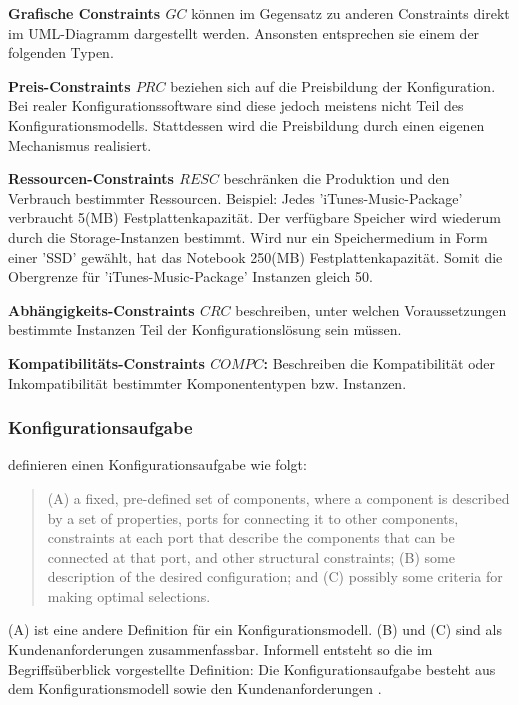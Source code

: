 \documentclass[12pt,a4paper,bibliography=totocnumbered,listof=totoc]{scrartcl}
\begin{document}
\begin{compactitem}
\item \textbf{Grafische Constraints $GC$} können im Gegensatz zu anderen Constraints direkt im UML-Diagramm dargestellt werden. Ansonsten entsprechen sie einem der folgenden Typen.
\item \textbf{Preis-Constraints $PRC$} beziehen sich auf die Preisbildung der Konfiguration. Bei realer Konfigurationssoftware sind diese jedoch meistens nicht Teil des Konfigurationsmodells. Stattdessen wird die Preisbildung durch einen eigenen Mechanismus realisiert.
\item \textbf{Ressourcen-Constraints $RESC$} beschränken die Produktion und den Verbrauch bestimmter Ressourcen. Beispiel:  Jedes 'iTunes-Music-Package' verbraucht 5(MB) Festplattenkapazität. Der verfügbare Speicher wird wiederum durch die Storage-Instanzen bestimmt. Wird nur ein Speichermedium in Form einer 'SSD' gewählt, hat das Notebook 250(MB) Festplattenkapazität. Somit die Obergrenze für 'iTunes-Music-Package' Instanzen gleich 50.
\item \textbf{Abhängigkeits-Constraints $CRC$} beschreiben, unter welchen Voraussetzungen bestimmte Instanzen Teil der Konfigurationslösung sein müssen.
\item \textbf{Kompatibilitäts-Constraints $COMPC$:} Beschreiben die Kompatibilität  oder Inkompatibilität bestimmter Komponententypen bzw. Instanzen.
\end{compactitem}

\subsubsection{Konfigurationsaufgabe}
\citet{mittal89} definieren einen Konfigurationsaufgabe wie folgt:
\begin{quote}
(A) a fixed, pre-defined set of components, where a component is described by a set of properties, ports for connecting it to other components, constraints at each port that describe the components that can be connected at that port, and other structural constraints; (B) some description of the desired configuration; and (C) possibly some criteria for making optimal selections.
\end{quote}
(A) ist eine andere Definition für ein Konfigurationsmodell. (B) und (C) sind als Kundenanforderungen zusammenfassbar. Informell entsteht so die im Begriffsüberblick vorgestellte Definition: Die Konfigurationsaufgabe besteht aus dem Konfigurationsmodell sowie den Kundenanforderungen \citep{felferning14}.
\end{document}
